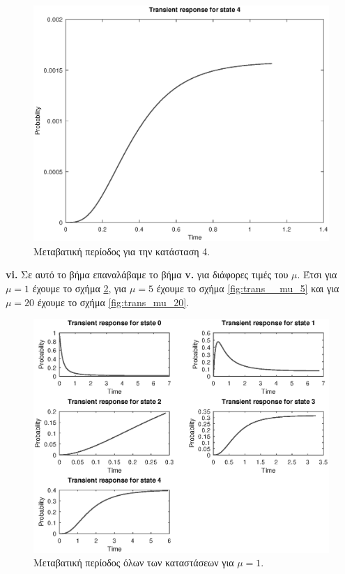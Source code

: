 \documentclass {article}
\newcommand{\english}[1]{\foreignlanguage{english}{#1}}
\begin{document}
\begin{figure}
	\includegraphics[width=\linewidth]{trans_4}
	\caption{Μεταβατική περίοδος για την κατάσταση 4.}
	\label{fig:trans_4}
\end{figure}

\textbf{\english{vi.}} Σε αυτό το βήμα επαναλάβαμε το βήμα \textbf{\english{v.}} για διάφορες τιμές του $μ$. Έτσι για $μ = 1$ έχουμε το σχήμα \ref{fig:trans_mu_1}, για $μ = 5$ έχουμε το σχήμα \ref{fig:trans__mu_5} και για $μ = 20$ έχουμε το σχήμα \ref{fig:trans_mu_20}.

\begin{figure}
	\includegraphics[width=\linewidth]{trans_mu_1}
	\caption{Μεταβατική περίοδος όλων των καταστάσεων για $μ = 1$.}
	\label{fig:trans_mu_1}
\end{figure}
\end{document}
